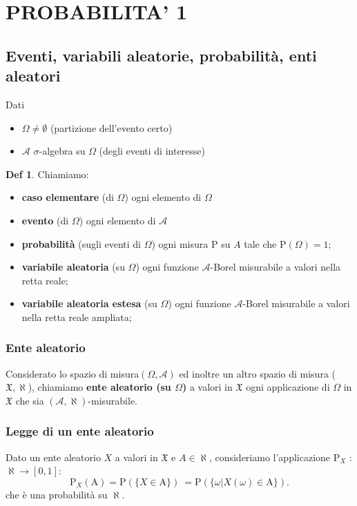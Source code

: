 \documentclass[a4paper,11pt]{article}
\theoremstyle{plain}
\theoremstyle{definition}
\newtheorem{defn}{Def}[section]
\theoremstyle{remark}
\begin{document}
\newpage



\section{PROBABILITA' 1}
\subsection{Eventi, variabili aleatorie, probabilità, enti aleatori}
Dati 
\begin{itemize}
    \item $\Omega\neq\emptyset$ (partizione dell'evento certo)
    \item $\mathcal{A}$ $\sigma$-algebra su $\Omega$ (degli eventi di interesse)
\end{itemize}


\begin{defn} Chiamiamo:
\begin{itemize}
    \item  \textbf{caso elementare} (di $\Omega$) ogni elemento di $\Omega$
    \item \textbf{evento} (di $\Omega$) ogni elemento di $\mathcal{A}$
    \item \textbf{probabilità} (sugli eventi di $\Omega$) ogni misura $\mathrm{P}$ su $A$ tale che $\mathrm{P}(\Omega)=1$;
    \item \textbf{variabile aleatoria} (su $\Omega$) ogni funzione $\mathcal{A}$-Borel misurabile a valori nella retta reale;
    \item \textbf{variabile aleatoria estesa} (su $\Omega$) ogni funzione $\mathcal{A}$-Borel misurabile a valori nella retta reale ampliata;
\end{itemize}
\end{defn}
\subsubsection{Ente aleatorio}

\noindent
Considerato lo spazio di misura$(\Omega, \mathcal{A})$ ed inoltre un altro spazio di misura ($\mathfrak{X}, \aleph$), chiamiamo \textbf{ente aleatorio (su $\Omega$)} a valori in $\mathfrak{X}$ ogni applicazione di $\Omega$ in $\mathfrak{X}$ che sia $(\mathcal{A}, \aleph)$-misurabile.


\subsubsection{Legge di un ente aleatorio}
Dato un ente aleatorio $X$ a valori in $\mathfrak{X}$ e  $A \in \aleph$, consideriamo l'applicazione $\mathrm{P}_{X}$ : $\mathcal{\aleph}\rightarrow[0,1]$:
$$
\mathrm{P}_{X}(\mathrm{A})=\mathrm{P}(\{X\in \mathrm{A}\})\ =\mathrm{P}(\{\omega|X(\omega)\in \mathrm{A}\}).
$$
che è una probabilità su $\aleph$.
\end{document}
